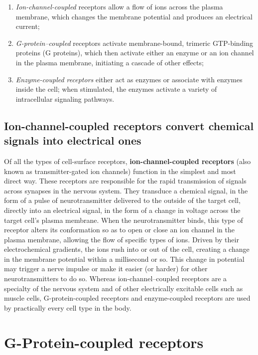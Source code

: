 \begin{enumerate}
\item \textit{Ion-channel-coupled} receptors allow a flow of ions
across the plasma membrane, which changes the membrane potential
and produces an electrical current;
\item \textit{G-protein–coupled} receptors activate membrane-bound, trimeric GTP-binding proteins (G
proteins), which then activate either an enzyme or an ion channel in the
plasma membrane, initiating a cascade of other effects;
\item \textit{Enzyme-coupled receptors} either act as enzymes or associate with
enzymes inside the cell; when stimulated, the enzymes
activate a variety of intracellular signaling pathways.
\end{enumerate}

\subsection{Ion-channel-coupled receptors convert chemical signals into electrical ones}

Of all the types of cell-surface receptors, \textbf{ion-channel-coupled receptors} 
(also known as transmitter-gated ion channels) function in the
simplest and most direct way. These receptors are responsible for the
rapid transmission of signals across synapses in the nervous system.
They transduce a chemical signal, in the form of a pulse of neurotransmitter 
delivered to the outside of the target cell, directly into an electrical
signal, in the form of a change in voltage across the target cell’s plasma
membrane. When the neurotransmitter binds, this type
of receptor alters its conformation so as to open or close an ion channel 
in the plasma membrane, allowing the flow of specific types of ions.
Driven by their electrochemical gradients, the ions rush into or out of the cell,
creating a change in the membrane potential within a millisecond or so.
This change in potential may trigger a nerve impulse or make it easier
(or harder) for other neurotransmitters to do so.
Whereas ion-channel–coupled receptors are a specialty of the nervous
system and of other electrically excitable cells such as muscle cells,
G-protein-coupled receptors and enzyme-coupled receptors are used
by practically every cell type in the body.

\section{G-Protein-coupled receptors}

